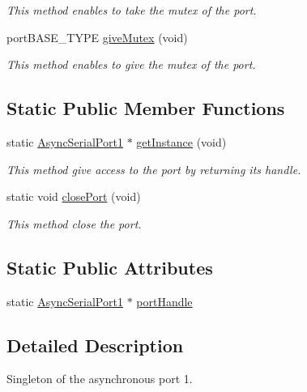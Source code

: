 \begin{DoxyCompactItemize}
\begin{DoxyCompactList}\small\item\em \-This method enables to take the mutex of the port. \end{DoxyCompactList}\item 
port\-B\-A\-S\-E\-\_\-\-T\-Y\-P\-E \hyperlink{class_async_serial_port1_a38c06002c0fb8fbd5b1eb8ea4ef6a69c}{give\-Mutex} (void)
\begin{DoxyCompactList}\small\item\em \-This method enables to give the mutex of the port. \end{DoxyCompactList}\end{DoxyCompactItemize}
\subsection*{\-Static \-Public \-Member \-Functions}
\begin{DoxyCompactItemize}
\item 
static \hyperlink{class_async_serial_port1}{\-Async\-Serial\-Port1} $\ast$ \hyperlink{class_async_serial_port1_a1c767b7bdd824c5b3fd4cdaa3dfc2081}{get\-Instance} (void)
\begin{DoxyCompactList}\small\item\em \-This method give access to the port by returning its handle. \end{DoxyCompactList}\item 
static void \hyperlink{class_async_serial_port1_a2dd7f83163710334d2dc5be1e53812be}{close\-Port} (void)
\begin{DoxyCompactList}\small\item\em \-This method close the port. \end{DoxyCompactList}\end{DoxyCompactItemize}
\subsection*{\-Static \-Public \-Attributes}
\begin{DoxyCompactItemize}
\item 
static \hyperlink{class_async_serial_port1}{\-Async\-Serial\-Port1} $\ast$ \hyperlink{class_async_serial_port1_a9661343083970644038cc10ba8e3d0a5}{port\-Handle}
\end{DoxyCompactItemize}


\subsection{\-Detailed \-Description}
\-Singleton of the asynchronous port 1. 

